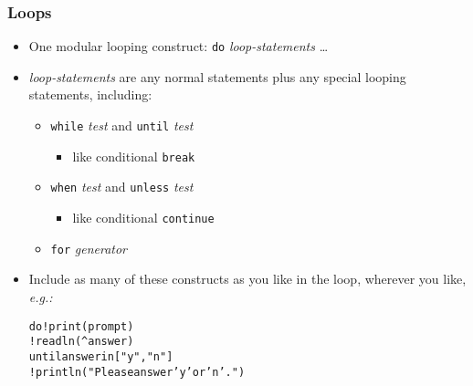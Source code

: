 \documentclass[12pt]{beamer}
\begin{document}
\begin{frame}
\frametitle{Loops}
\begin{itemize}
\item One modular looping construct: \texttt{do} \emph{loop-statements} \ldots
\item \emph{loop-statements} are any normal statements plus any
  special looping statements, including:
  \begin{itemize}
  \item \texttt{while} \emph{test} and \texttt{until} \emph{test}
    \begin{itemize}
    \item like conditional \texttt{break}
    \end{itemize}
  \item \texttt{when} \emph{test} and \texttt{unless} \emph{test}
    \begin{itemize}
    \item like conditional \texttt{continue}
    \end{itemize}
  \item \texttt{for} \emph{generator}
  \end{itemize}
\item Include as many of these constructs as you like in the loop,
  wherever you like, \emph{e.g.:} \\
\begin{alltt}
\hspace*{2em}do  !print(prompt) \\
\hspace*{3em}    !readln(\^{ }answer) \\
\hspace*{3em}    until answer in ["y","n"] \\
\hspace*{3em}    !println("Please answer 'y' or 'n'.") \\
\end{alltt}
\end{itemize}
\end{frame}
\end{document}
